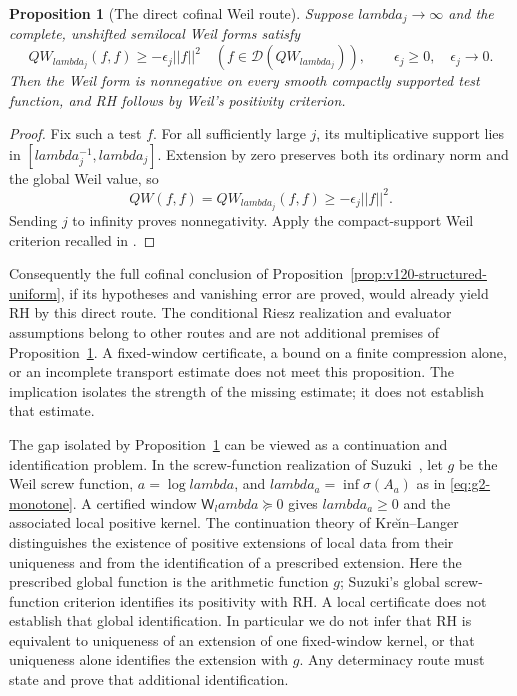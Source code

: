 \documentclass[11pt]{article}
\def\lambda{lambda}%
\def\norm#1{||#1||}%
\newtheorem{proposition}[theorem]{Proposition}
\theoremstyle{remark}
\newcommand{\norm}[1]{\left\lVert #1\right\rVert}
\begin{document}
\begin{proposition}[The direct cofinal Weil route]\label{prop:v121-cofinal-rh}
Suppose $\lambda_j\to\infty$ and the complete, unshifted semilocal
Weil forms satisfy
\[
 QW_{\lambda_j}(f,f)\ge-\epsilon_j\norm f^2
 \quad(f\in\mathcal D(QW_{\lambda_j})),
 \qquad \epsilon_j\ge0,\quad\epsilon_j\to0.
\]
Then the Weil form is nonnegative on every smooth compactly supported
test function, and RH follows by Weil's positivity criterion.
\end{proposition}
\begin{proof}
Fix such a test $f$. For all sufficiently large $j$, its multiplicative
support lies in $[\lambda_j^{-1},\lambda_j]$. Extension by zero
preserves both its ordinary norm and the global Weil value, so
\[
 QW(f,f)=QW_{\lambda_j}(f,f)\ge-\epsilon_j\norm f^2.
\]
Sending $j$ to infinity proves nonnegativity. Apply the compact-support
Weil criterion recalled in \cite{ConnesConsaniMoscovici2025}.
\end{proof}

Consequently the full cofinal conclusion of
Proposition~\ref{prop:v120-structured-uniform}, if its hypotheses and
vanishing error are proved, would already yield RH by this direct route.
The conditional Riesz realization and evaluator assumptions belong to
other routes and are not additional premises of
Proposition~\ref{prop:v121-cofinal-rh}. A fixed-window certificate,
a bound on a finite compression alone, or an incomplete transport
estimate does not meet this proposition. The implication isolates the
strength of the missing estimate; it does not establish that estimate.

The gap isolated by Proposition~\ref{prop:v121-cofinal-rh} can be
viewed as a continuation and identification problem. In the screw-function
realization of Suzuki~\cite{Suzuki2026}, let $g$ be the Weil screw
function, $a=\log\lambda$, and $\lambda_a=\inf\sigma(A_a)$ as in
\eqref{eq:g2-monotone}. A certified window
$\mathsf W_\lambda\succeq0$ gives $\lambda_a\ge0$ and the associated
local positive kernel. The continuation theory of
Kre\u{\i}n--Langer~\cite{KreinLanger2014} distinguishes the existence of
positive extensions of local data from their uniqueness and from the
identification of a prescribed extension. Here the prescribed global
function is the arithmetic function $g$; Suzuki's global screw-function
criterion identifies its positivity with RH. A local certificate does
not establish that global identification. In particular we do not infer
that RH is equivalent to uniqueness of an extension of one fixed-window
kernel, or that uniqueness alone identifies the extension with $g$.
Any determinacy route must state and prove that additional identification.
\end{document}
